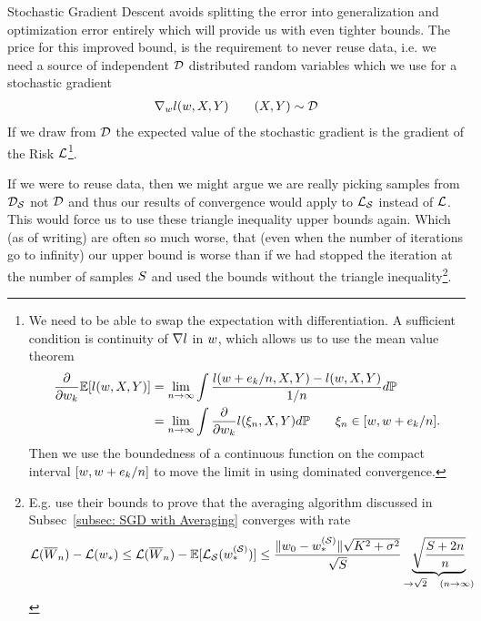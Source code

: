 Stochastic Gradient Descent avoids splitting the error into generalization and
optimization error entirely which will provide us with even tighter bounds. The
price for this improved bound, is the requirement to never reuse data, i.e. we
need a source of independent \(\mathcal{D}\) distributed random variables which we use
for a stochastic gradient
%
\begin{align*}
	\nabla_\weights\loss (\weights, X,Y) \qquad (X,Y)\sim\dist%
\end{align*}
%
If we draw from \(\mathcal{D}\) the expected value of the stochastic gradient is the
gradient of the Risk \(\mathcal{L}\)\footnote{
	We need to be able to swap the expectation with differentiation. A sufficient 
	condition is continuity of \(\nabla l\) in \(w\), which allows us
	to use the mean value theorem
	\begin{align*}
		\frac{\partial}{\partial w_k}\mathbb{E}[l(w, X,Y)]
		&= \lim_{n\to\infty}
		\int\frac{l(w+e_k/n, X,Y)-l(w,X,Y)}{1/n}d\mathbb{P}
		\\
		&=\lim_{n\to\infty} \int\frac{\partial}{\partial w_k}l(\xi_n, X,Y)d\mathbb{P}
		\qquad \xi_n \in [w, w + e_k/n].
	\end{align*}
	Then we use the boundedness of a continuous function on the compact interval
	\([w, w + e_k/n]\) to move the limit in using
	dominated convergence.
}.

If we were to reuse data, then we might argue we are really picking samples
from \(\mathcal{D}_{\mathcal{S}}\) not \(\mathcal{D}\) and thus our results of convergence would
apply to \(\mathcal{L}_{\mathcal{S}}\) instead of \(\mathcal{L}\). This would force us to use
these triangle inequality upper bounds again. Which (as of writing) are often so
much worse, that (even when the number of iterations go to infinity) our upper
bound is worse than if we had stopped the iteration at the number of samples
\(S\) and used the bounds without the triangle inequality\footnote{
	E.g. \textcite{hardtTrainFasterGeneralize2016} use their bounds to prove that
	the averaging algorithm discussed in Subsec~\ref{subsec: SGD with Averaging}
	converges with rate
	\begin{align*}
		\mathcal{L}(\overline{W}_n) - \mathcal{L}(w_*)
		\le \mathcal{L}(\overline{W}_n) - \mathbb{E}[\mathcal{L}_{\mathcal{S}}(w_*^{(\mathcal{S})})]
		\le \frac{\|w_0 -w_*^{(\mathcal{S})}\|\sqrt{K^2 + \sigma^2}}{\sqrt{S}}
		\underbrace{\sqrt{\frac{S+2n}{n}}}_{\to \sqrt{2} \quad (n\to\infty)}
	\end{align*}
}.

